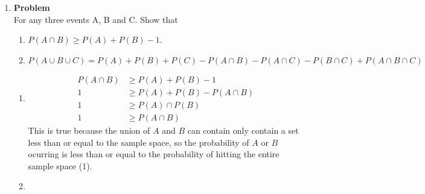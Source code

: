 \documentclass[12pt]{article}
\newenvironment{Ex}{\textbf{Problem}\vspace{.75em}\\}{}
\begin{document}
\begin{enumerate}
\begin{Ex}
\begin{solution}
\begin{enumerate}
        And now we can insert the sets into the equation:
        \begin{equation*}
          \begin{aligned}
            A &= (A^c \cup B^c)^c \cup (A^c \cup B)^c \\
            &= (\{1,2,4,5\} \cup \{4,6\})^c \cup (\{1,2,4,5\}
            \cup \{1,2,3,5\})^c \\
            &= (\{1,2,4,5,6\})^c \cup (\{1,2,3,4,5\})^c \\
            &= \{3\} \cup \{6\} \\
            \{3, 6\} &= \{3, 6\}
          \end{aligned}
        \end{equation*}
        The probabilities for both sides have been determined to be
        equivalent ($\frac{1}{3}$).
      \end{enumerate}
    \end{solution}
  \end{Ex}
\item
  \begin{Ex} For any three events A, B and C. Show that
    \begin{enumerate}
    \item $P(A \cap B) \ge P(A)+P(B) - 1$.
    \item $P(A \cup B \cup C) = P(A) + P(B) + P(C) - P(A \cap B) - P(A
      \cap C) - P(B \cap C) + P(A \cap B \cap C)$
    \end{enumerate}
    \begin{solution} \hfill
      \begin{enumerate}
      \item 
        \begin{equation*}
          \begin{aligned}
            P(A \cap B) &\ge P(A) + P(B) - 1 \\
            1 &\ge P(A) + P(B) - P(A \cap B) \\
            1 &\ge P(A) \cap P(B) \\
            1 &\ge P(A \cap B)
          \end{aligned}
        \end{equation*}
        This is true because the union of $A$ and $B$ can contain only
        contain a set less than or equal to the sample space, so the
        probability of $A$ or $B$ ocurring is less than or equal to
        the probability of hitting the entire sample space (1).
      \item
        \begin{equation*}

\end{equation*}
\end{enumerate}
\end{solution}
\end{Ex}
\end{enumerate}
\end{document}
